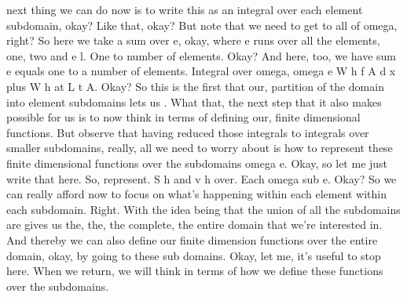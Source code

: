 \documentclass[10pt]{article}
\begin{document}
next thing we can do now is to write this as an integral over each element subdomain, okay? Like that, okay? But note that we need to get to all of omega, right? So here we take a sum over e, okay, where e runs over all the elements, one, two and e l. One to number of elements. Okay? And here, too, we have sum e equals one to a number of elements. Integral over omega, omega e W h f A d x plus W h at L t A. Okay? So this is the first that our, partition of the domain into element subdomains lets us . What that, the next step that it also makes possible for us is to now think in terms of defining our, finite dimensional functions. But observe that having reduced those integrals to integrals over smaller subdomains, really, all we need to worry about is how to represent these finite dimensional functions over the subdomains omega e. Okay, so let me just write that here. So, represent. S h and v h over. Each omega sub e. Okay? So we can really afford now to focus on what's happening within each element within each subdomain. Right. With the idea being that the union of all the subdomains are gives us the, the, the complete, the entire domain that we're interested in. And thereby we can also define our finite dimension functions over the entire domain, okay, by going to these sub domains. Okay, let me, it's useful to stop here. When we return, we will think in terms of how we define these functions over the subdomains.
\end{document}
